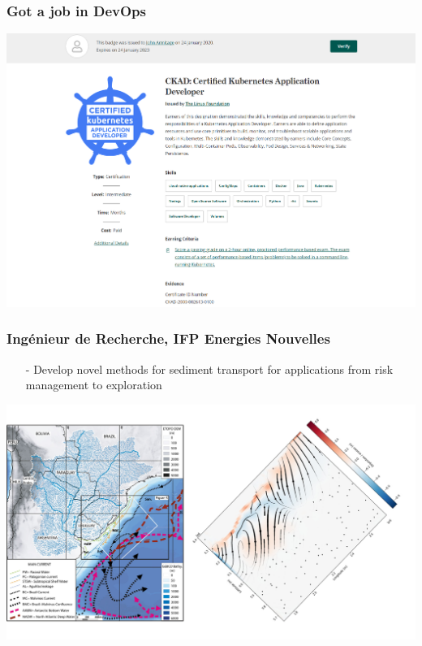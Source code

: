 \documentclass[aspectratio=169]{beamer}
\begin{document}
\begin{frame}
    \frametitle{Got a job in DevOps}
    \centering
    \includegraphics[width=0.7\paperwidth]{./pictures/kubernetes.png}
\end{frame}

\begin{frame}
    \frametitle{Ing{\'e}nieur de Recherche, IFP Energies Nouvelles}
    \begin{itemize}
        \item[-]{Develop novel methods for sediment transport for applications from risk management to exploration}
    \end{itemize}
    \centering
    \includegraphics[width=0.6\paperwidth]{./pictures/bottom-currents.png}
\end{frame}
\end{document}
